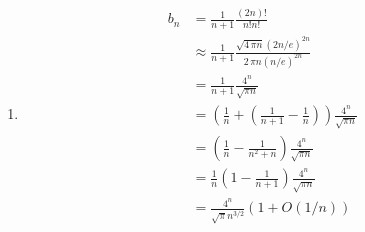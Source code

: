 \documentclass[12pt]{scrartcl}
\begin{document}
\begin{enumerate}
    \item \begin{align*}
            b_n &= \frac{1}{n+1} \frac{(2n)!}{n!n!} \ \\
                &\approx \frac{1}{n + 1} \frac{\sqrt{4\,\pi n}{(2n / e)}^{2n}}{2\,\pi n {(n / e)}^{2n}} \\
                &= \frac{1}{n+1} \frac{4^n}{\sqrt{\pi n}} \\
                &= \left(\frac{1}{n} + \left (\frac{1}{n+1} - \frac{1}{n} \right) \right) \frac{4^n}{\sqrt{\pi n} } \\
                &= \left(\frac{1}{n} - \frac{1}{n^2+n} \right) \frac{4^n}{\sqrt{\pi n} } \\
                &=  \frac{1}{n} \left(1 - \frac{1}{n+1} \right) \frac{4^n}{\sqrt{\pi n}} \\
                &=  \frac{4^n}{\sqrt{\pi}n^{3/2}} (1 + O(1/n))
        \end{align*}
\end{enumerate}
\end{document}
